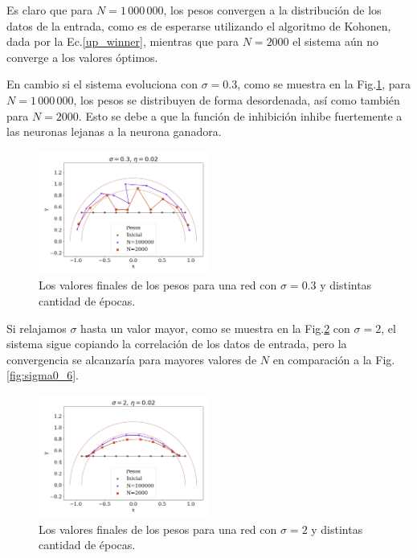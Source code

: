 Es claro que para $N=1\,000\,000$, los pesos convergen a la distribución de los datos de la entrada, como es de esperarse utilizando el algoritmo de Kohonen, dada por la Ec.\ref{up_winner}, mientras que para $N=2000$ el sistema aún no converge a los valores óptimos.

En cambio si el sistema evoluciona con $\sigma=0.3$, como se muestra en la Fig.\ref{fig:sigma0_3}, para $N=1\,000\,000$, los pesos se distribuyen de forma desordenada, así como también para $N=2000$. Esto se debe a que la función de inhibición inhibe fuertemente a las neuronas lejanas a la neurona ganadora.
\begin{figure}[H]
	\centering
	\includegraphics[width=0.5\textwidth]{../Graficos/sigma0_3eta0_02.png}
	\caption{Los valores finales de los pesos para una red con $\sigma=0.3$ y distintas cantidad de épocas.}
	\label{fig:sigma0_3}
\end{figure}


Si relajamos $\sigma$ hasta un valor mayor, como se muestra en la Fig.\ref{fig:sigma2} con $\sigma=2$, el sistema sigue copiando la correlación de los datos de entrada, pero la convergencia se alcanzaría para mayores valores de $N$ en comparación a la Fig.\ref{fig:sigma0_6}.

\begin{figure}[H]
	\centering
	\includegraphics[width=0.5\textwidth]{../Graficos/sigma2eta0_02.png}
	\caption{Los valores finales de los pesos para una red con $\sigma=2$ y distintas cantidad de épocas.}
	\label{fig:sigma2}
\end{figure}

